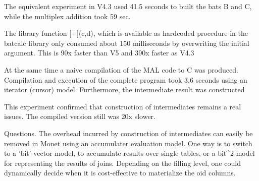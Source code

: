 \documentclass[10pt,twocolumn,fleqn]{article}
\begin{document}
The equivalent experiment in V4.3 used 41.5 seconds to
built the bats B and C, while the multiplex addition took 59 sec.

The library function [+](c,d), which is available as hardcoded procedure
in the batcalc library only consumed about 150 milliseconds by overwriting
the initial argument. This is 90x faster than V5 and 390x faster as V4.3

At the same time a naive compilation of the MAL code to C was produced.
Compilation and execution of the complete program took 3.6 seconds using
an iterator (cursor) model. Furthermore, the intermediate result was constructed

This experiment confirmed that construction of intermediates remains a real
issues. The compiled version still was 20x slower.

Questions. The overhead incurred by construction of intermediates can easily
be removed in Monet using an accumulater evaluation model. 
One way is to switch to a 'bit'-vector model, to accumulate results over
single tables,  or a bit^2 model for representing the results of joins.
Depending on the filling level, one could dynamically decide when it
is cost-effective to materialize the oid columns.
\end{document}
